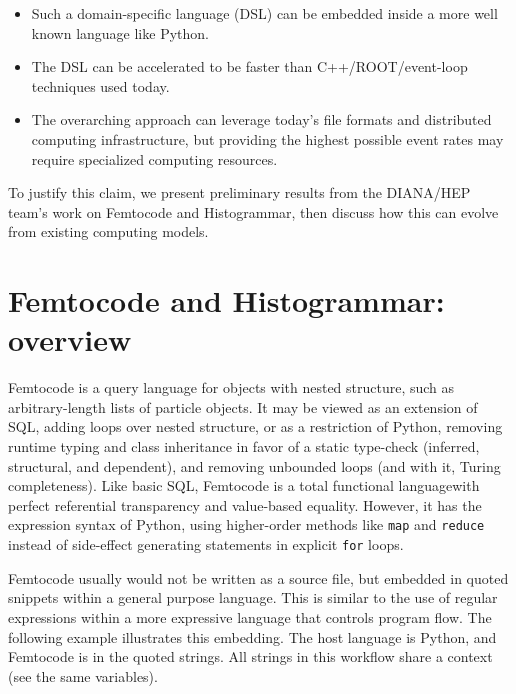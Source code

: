 \documentclass{article}
\begin{document}
\begin{itemize}
\item Such a domain-specific language (DSL) can be embedded inside a more well known language like Python.
\item The DSL can be accelerated to be faster than C++/ROOT/event-loop techniques used today.
\item The overarching approach can leverage today's file formats and distributed computing infrastructure, but providing the highest possible event rates may require specialized computing resources.
\end{itemize}

To justify this claim, we present preliminary results from the DIANA/HEP team's work on Femtocode and Histogrammar, then discuss how this can evolve from existing computing models.

\section{Femtocode and Histogrammar: overview}

Femtocode is a query language for objects with nested structure, such as arbitrary-length lists of particle objects. It may be viewed as an extension of SQL, adding loops over nested structure, or as a restriction of Python, removing runtime typing and class inheritance in favor of a static type-check (inferred, structural, and dependent), and removing unbounded loops (and with it, Turing completeness). Like basic SQL, Femtocode is a total functional language\footnotemark with perfect referential transparency and value-based equality. However, it has the expression syntax of Python, using higher-order methods like {\tt map} and {\tt reduce} instead of side-effect generating statements in explicit {\tt for} loops.


Femtocode usually would not be written as a source file, but embedded in quoted snippets within a general purpose language. This is similar to the use of regular expressions within a more expressive language that controls program flow. The following example illustrates this embedding. The host language is Python, and Femtocode is in the quoted strings. All strings in this workflow share a context (see the same variables).
\end{document}
